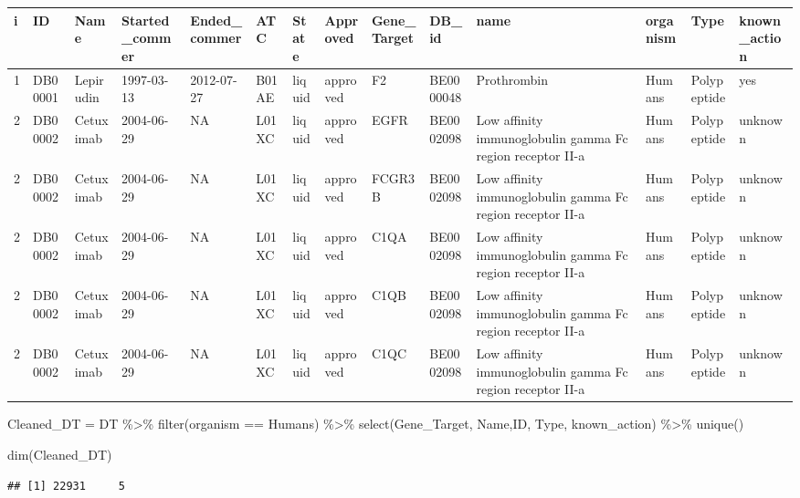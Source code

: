 \documentclass[
]{book}
\newenvironment{Shaded}{\begin{snugshade}}{\end{snugshade}}
\newcommand{\FunctionTok}[1]{\textcolor[rgb]{0.00,0.00,0.00}{#1}}
\newcommand{\NormalTok}[1]{#1}
\newcommand{\OtherTok}[1]{\textcolor[rgb]{0.56,0.35,0.01}{#1}}
\newcommand{\SpecialCharTok}[1]{\textcolor[rgb]{0.00,0.00,0.00}{#1}}
\newcommand{\StringTok}[1]{\textcolor[rgb]{0.31,0.60,0.02}{#1}}
\begin{document}
\begin{tabular}{l|l|l|l|l|l|l|l|l|l|l|l|l|l}
\hline
i & ID & Name & Started\_commer & Ended\_commer & ATC & State & Approved & Gene\_Target & DB\_id & name & organism & Type & known\_action\\
\hline
1 & DB00001 & Lepirudin & 1997-03-13 & 2012-07-27 & B01AE & liquid & approved & F2 & BE0000048 & Prothrombin & Humans & Polypeptide & yes\\
\hline
2 & DB00002 & Cetuximab & 2004-06-29 & NA & L01XC & liquid & approved & EGFR & BE0002098 & Low affinity immunoglobulin gamma Fc region receptor II-a & Humans & Polypeptide & unknown\\
\hline
2 & DB00002 & Cetuximab & 2004-06-29 & NA & L01XC & liquid & approved & FCGR3B & BE0002098 & Low affinity immunoglobulin gamma Fc region receptor II-a & Humans & Polypeptide & unknown\\
\hline
2 & DB00002 & Cetuximab & 2004-06-29 & NA & L01XC & liquid & approved & C1QA & BE0002098 & Low affinity immunoglobulin gamma Fc region receptor II-a & Humans & Polypeptide & unknown\\
\hline
2 & DB00002 & Cetuximab & 2004-06-29 & NA & L01XC & liquid & approved & C1QB & BE0002098 & Low affinity immunoglobulin gamma Fc region receptor II-a & Humans & Polypeptide & unknown\\
\hline
2 & DB00002 & Cetuximab & 2004-06-29 & NA & L01XC & liquid & approved & C1QC & BE0002098 & Low affinity immunoglobulin gamma Fc region receptor II-a & Humans & Polypeptide & unknown\\
\hline
\end{tabular}

\begin{Shaded}
\begin{Highlighting}[]
\NormalTok{Cleaned\_DT }\OtherTok{=}\NormalTok{ DT }\SpecialCharTok{\%\textgreater{}\%} 
  \FunctionTok{filter}\NormalTok{(organism }\SpecialCharTok{==} \StringTok{\textquotesingle{}Humans\textquotesingle{}}\NormalTok{) }\SpecialCharTok{\%\textgreater{}\%}
  \FunctionTok{select}\NormalTok{(Gene\_Target, Name,ID, Type, known\_action) }\SpecialCharTok{\%\textgreater{}\%}
  \FunctionTok{unique}\NormalTok{() }

\FunctionTok{dim}\NormalTok{(Cleaned\_DT)}
\end{Highlighting}
\end{Shaded}

\begin{verbatim}
## [1] 22931     5
\end{verbatim}
\end{document}
